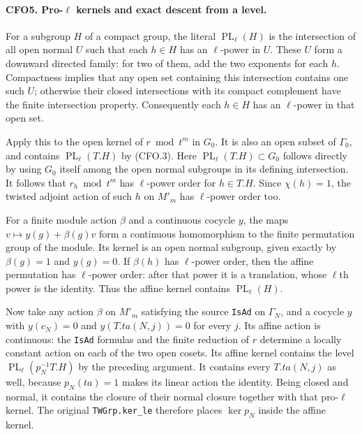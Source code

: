 \paragraph{CFO5. Pro-$\ell$ kernels and exact descent from a level.}
\label{claim:CFO5}
For a subgroup $H$ of a compact group, the literal
$\operatorname{PL}_\ell(H)$ is the intersection of all open
normal $U$ such that each $h\in H$ has an $\ell$-power in $U$.
These $U$ form a downward directed family: for two of them,
add the two exponents for each $h$.  Compactness implies that
any open set containing this intersection contains one such
$U$; otherwise their closed intersections with its compact
complement have the finite intersection property.  Consequently
each $h\in H$ has an $\ell$-power in that open set.

Apply this to the open kernel of $r\bmod t^m$ in $G_0$.
It is also an open subset of $\Gamma_0$, and contains
$\operatorname{PL}_\ell(T.H)$ by (CFO.3).
Here $\operatorname{PL}_\ell(T.H)\subset G_0$ follows
directly by using $G_0$ itself among the open normal
subgroups in its defining intersection.
It follows that $r_h\bmod t^m$ has $\ell$-power order for
$h\in T.H$.  Since $\chi(h)=1$, the twisted adjoint action
of such $h$ on $M'_m$ has $\ell$-power order too.

For a finite module action $\beta$ and a continuous cocycle $y$,
the maps
$v\mapsto y(g)+\beta(g)v$ form a continuous homomorphism to the
finite permutation group of the module.  Its kernel is an open
normal subgroup, given exactly by
$\beta(g)=1$ and $y(g)=0$.  If $\beta(h)$ has $\ell$-power
order, then the affine permutation has $\ell$-power order:
after that power it is a translation, whose $\ell$th power is
the identity.  Thus the affine kernel contains
$\operatorname{PL}_\ell(H)$.

Now take any action $\beta$ on $M'_m$ satisfying the source
\texttt{IsAd} on $\Gamma_N$, and a cocycle $y$ with
$y(c_N)=0$ and $y(T.ta(N,j))=0$ for every $j$.  Its affine
action is continuous: the \texttt{IsAd} formulas and the
finite reduction of $r$ determine a locally constant
action on each of the two open cosets.  Its affine
kernel contains the level
$\operatorname{PL}_\ell(p_N^{-1}T.H)$ by the preceding argument.
It contains every $T.ta(N,j)$ as well, because $p_N(ta)=1$
makes its linear action the identity.  Being closed and normal,
it contains the closure of their normal closure together with
that pro-$\ell$ kernel.  The original \texttt{TWGrp.ker\_le}
therefore places $\ker p_N$ inside the affine kernel.

